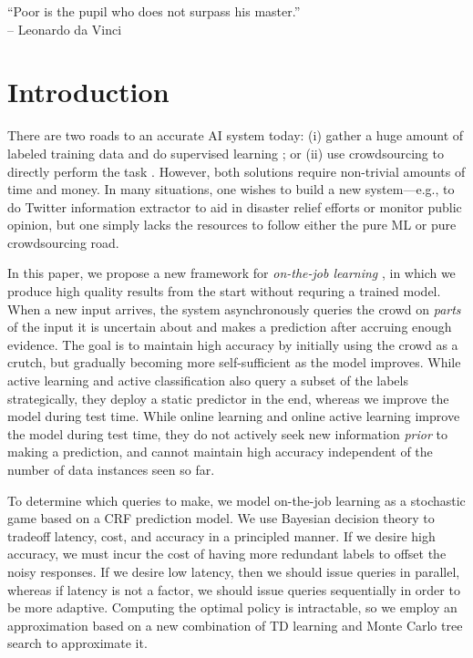 \begin{epigraph}
``Poor is the pupil who does not surpass his master.''\\
-- Leonardo da Vinci
\end{epigraph}


\section{Introduction}
\label{sec:intro}

There are two roads to an accurate AI system today:
(i) gather a huge amount of labeled training data \citep{deng2009imagenet} and do supervised learning \citep{krizhevsky2012imagenet};
or (ii) use crowdsourcing to directly perform the task \citep{bernstein2010soylent,kokkalis2013emailvalet}.
However, both solutions require non-trivial amounts of time and money.
In many situations, one wishes to build a new system---e.g., to do Twitter information extractor
\citep{li2012twiner} to aid in disaster relief efforts or monitor public
opinion, but one simply lacks the resources to follow either the pure ML or pure crowdsourcing road.

In this paper, we propose a new framework for \emph{on-the-job learning} \citep{lasecki2013real},
in which we produce high quality results from the start without requring a trained model.
When a new input arrives,
the system asynchronously queries the crowd on \emph{parts} of the input it is
uncertain about and makes a prediction after accruing enough evidence.
The goal is to maintain high accuracy by initially using the crowd as a crutch,
but gradually becoming more self-sufficient as the model improves.
While active learning \citep{settles2010active} and active classification \citep{gao2011active}
also query a subset of the labels strategically,
they deploy a static predictor in the end,
whereas we improve the model during test time.
While online learning \citep{cesabianchi06prediction} and
online active learning \citep{helmbold1997some,sculley2007online,chu2011unbiased}
improve the model during test time,
they do not actively seek new information \emph{prior} to making a prediction,
and cannot maintain high accuracy independent of the number of data instances seen so far.

To determine which queries to make,
we model on-the-job learning as a stochastic game based on a CRF prediction model.
We use Bayesian decision theory to tradeoff latency, cost, and accuracy in a principled manner.
If we desire high accuracy, we must incur the cost of having more redundant labels
to offset the noisy responses.  If we desire low latency, then we should issue queries
in parallel, whereas if latency is not a factor, we should issue queries
sequentially in order to be more adaptive.
Computing the optimal policy is intractable,
so we employ an approximation
based on a new combination of TD learning \citep{sutton1988learning}
and Monte Carlo tree search \citep{kocsis2006bandit} to approximate it.

